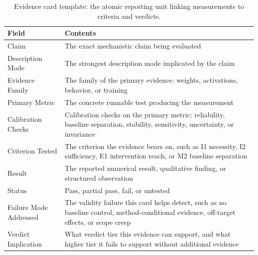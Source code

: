 \documentclass{article}
\begin{document}
\begin{table}[H]
\centering
\small
\caption{Evidence card template: the atomic reporting unit linking measurements to criteria and verdicts.}
\renewcommand{\arraystretch}{1.2}
\begin{tabular}{@{}lp{10cm}@{}}
\toprule
\textbf{Field} & \textbf{Contents} \\
\midrule
Claim & The exact mechanistic claim being evaluated \\
\midrule
Description Mode & The strongest description mode implicated by the claim \\
\midrule
Evidence Family & The family of the primary evidence: weights, activations, behavior, or training \\
\midrule
Primary Metric & The concrete runnable test producing the measurement \\
\midrule
Calibration Checks & Calibration checks on the primary metric: reliability, baseline separation, stability, sensitivity, uncertainty, or invariance \\
\midrule
Criterion Tested & The criterion the evidence bears on, such as I1 necessity, I2 sufficiency, E1 intervention reach, or M2 baseline separation \\
\midrule
Result & The reported numerical result, qualitative finding, or structured observation \\
\midrule
Status & Pass, partial pass, fail, or untested \\
\midrule
Failure Mode Addressed & The validity failure this card helps detect, such as no baseline control, method-conditional evidence, off-target effects, or scope creep \\
\midrule
Verdict Implication & What verdict tier this evidence can support, and what higher tier it fails to support without additional evidence \\
\bottomrule
\end{tabular}
\label{tabevidencecardtemplate}
\end{table}
\end{document}

